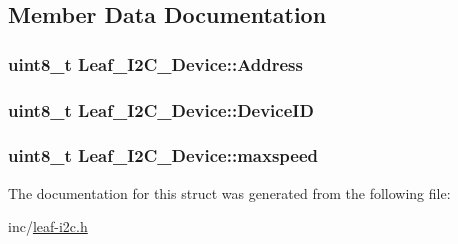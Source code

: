 \subsection{Member Data Documentation}
\hypertarget{structLeaf__I2C__Device_ac633599d8088a5ec3262087ca2de76e2}{
\subsubsection[{Address}]{\setlength{\rightskip}{0pt plus 5cm}uint8\-\_\-t Leaf\-\_\-\-I2\-C\-\_\-\-Device\-::\-Address}}\label{structLeaf__I2C__Device_ac633599d8088a5ec3262087ca2de76e2}
\hypertarget{structLeaf__I2C__Device_a0bca2bbd3747ab6745d5f9c42cee2ae5}{
\subsubsection[{Device\-I\-D}]{\setlength{\rightskip}{0pt plus 5cm}uint8\-\_\-t Leaf\-\_\-\-I2\-C\-\_\-\-Device\-::\-Device\-I\-D}}\label{structLeaf__I2C__Device_a0bca2bbd3747ab6745d5f9c42cee2ae5}
\hypertarget{structLeaf__I2C__Device_ae821fbd95dcf56b25e65e31d9f543c03}{
\subsubsection[{maxspeed}]{\setlength{\rightskip}{0pt plus 5cm}uint8\-\_\-t Leaf\-\_\-\-I2\-C\-\_\-\-Device\-::maxspeed}}\label{structLeaf__I2C__Device_ae821fbd95dcf56b25e65e31d9f543c03}


The documentation for this struct was generated from the following file\-:\begin{DoxyCompactItemize}
\item 
inc/\hyperlink{leaf-i2c_8h}{leaf-\/i2c.\-h}\end{DoxyCompactItemize}
